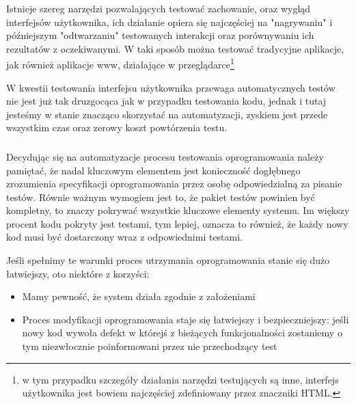         Istnieje szereg narzędzi pozwalających testować zachowanie, oraz wygląd interfejsów użytkownika, ich działanie opiera się najczęściej na "nagrywaniu" i późniejszym "odtwarzaniu" testowanych interakcji oraz porównywaniu ich rezultatów z oczekiwanymi. W taki sposób można testować tradycyjne aplikacje, jak również aplikacje www, działające w przeglądarce\footnote{w tym  przypadku szczegóły działania narzędzi testujących są inne, interfejs użytkownika jest bowiem najczęściej zdefiniowany przez znaczniki HTML.}
        
        W kwestii testowania interfejsu użytkownika przewaga automatycznych testów nie jest już tak druzgocąca jak w przypadku testowania kodu, jednak i tutaj jesteśmy w stanie znacząco skorzystać na automatyzacji, zyskiem jest przede wszystkim czas oraz zerowy koszt powtórzenia testu.
        
      \subsubsection{}

        Decydując się na automatyzacje procesu testowania oprogramowania należy pamiętać, że nadal kluczowym elementem jest konieczność dogłębnego zrozumienia specyfikacji oprogramowania przez osobę odpowiedzialną za pisanie testów. Równie ważnym wymogiem jest to, że pakiet testów powinien być kompletny, to znaczy pokrywać wszystkie kluczowe elementy systemu. Im większy procent kodu pokryty jest testami, tym lepiej, oznacza to również, że każdy nowy kod musi być dostarczony wraz z odpowiednimi testami.
        
        Jeśli spełnimy te warunki proces utrzymania oprogramowania stanie się dużo łatwiejszy, oto niektóre z korzyści:
        
         \begin{itemize}
     	    \item Mamy pewność, że system działa zgodnie z założeniami
     	    \item Proces modyfikacji oprogramowania staje się łatwiejszy i bezpieczniejszy: jeśli nowy kod wywoła defekt w którejś z bieżących funkcjonalności zostaniemy o tym niezwłocznie poinformowani przez nie przechodzący test
     	  \end{itemize}
        